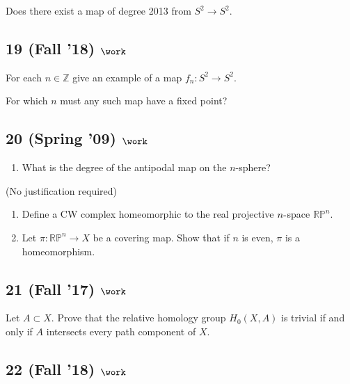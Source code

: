 Does there exist a map of degree 2013 from \(S^2 \to S^2\).

\hypertarget{fall-18-work-6}{%
\subsection{\texorpdfstring{19 (Fall '18)
\(\work\)}{19 (Fall '18) \textbackslash work}}\label{fall-18-work-6}}

For each \(n \in {\mathbb{Z}}\) give an example of a map
\(f_n : S^2 \to S^2\).

For which \(n\) must any such map have a fixed point?

\hypertarget{spring-09-work-5}{%
\subsection{\texorpdfstring{20 (Spring '09)
\(\work\)}{20 (Spring '09) \textbackslash work}}\label{spring-09-work-5}}

\begin{enumerate}
\def\labelenumi{\alph{enumi}.}
\tightlist
\item
  What is the degree of the antipodal map on the \(n\)-sphere?
\end{enumerate}

(No justification required)

\begin{enumerate}
\def\labelenumi{\alph{enumi}.}
\setcounter{enumi}{1}
\item
  Define a CW complex homeomorphic to the real projective
  \(n{\hbox{-}}\)space \({\mathbb{RP}}^n\).
\item
  Let \(\pi : {\mathbb{RP}}^n \to X\) be a covering map. Show that if
  \(n\) is even, \(\pi\) is a homeomorphism.
\end{enumerate}

\hypertarget{fall-17-work-3}{%
\subsection{\texorpdfstring{21 (Fall '17)
\(\work\)}{21 (Fall '17) \textbackslash work}}\label{fall-17-work-3}}

Let \(A \subset X\). Prove that the relative homology group
\(H_0 (X, A)\) is trivial if and only if \(A\) intersects every path
component of \(X\).

\hypertarget{fall-18-work-7}{%
\subsection{\texorpdfstring{22 (Fall '18)
\(\work\)}{22 (Fall '18) \textbackslash work}}\label{fall-18-work-7}}

